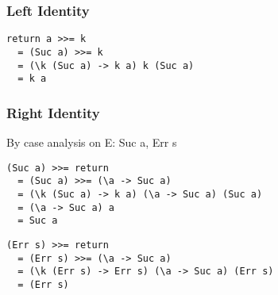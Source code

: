 \documentclass{beamer}
\begin{document}
\begin{frame}[fragile]
\frametitle{Left Identity}
\begin{lstlisting}
return a >>= k 
  = (Suc a) >>= k 
  = (\k (Suc a) -> k a) k (Suc a) 
  = k a
\end{lstlisting}
\end{frame}

\begin{frame}[fragile]
\frametitle{Right Identity}
By case analysis on E: Suc a, Err s
\begin{lstlisting}
(Suc a) >>= return 
  = (Suc a) >>= (\a -> Suc a)
  = (\k (Suc a) -> k a) (\a -> Suc a) (Suc a)
  = (\a -> Suc a) a
  = Suc a
\end{lstlisting}
\begin{lstlisting}
(Err s) >>= return
  = (Err s) >>= (\a -> Suc a)
  = (\k (Err s) -> Err s) (\a -> Suc a) (Err s)
  = (Err s)
\end{lstlisting}
\end{frame}


\end{document}
